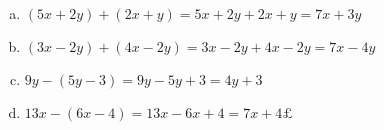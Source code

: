 \documentclass {article}
\begin{document}
\begin{enumerate}[a)]
\item $(5x + 2y) + (2x + y) = 5x + 2y + 2x + y = 7x + 3y$
\item $(3x - 2y) + (4x - 2y) = 3x - 2y + 4x - 2y = 7x - 4y$
\item $9y - (5y - 3) = 9y - 5y + 3 = 4y + 3$
\item $13x - (6x - 4) = 13x - 6x + 4 = 7x + 4£$ 
\end{enumerate}
\end{document}

